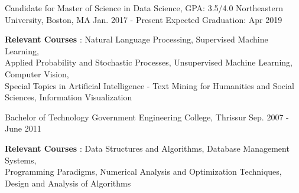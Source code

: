 \vspace{-0.1cm}
\begin{cventries}
  \cventry
    {Candidate for Master of Science in Data Science, GPA: 3.5/4.0}
    {Northeastern University, Boston, MA}
    {Jan. 2017 - Present}
    {Expected Graduation: Apr 2019 }
    {
      \begin{cvitems}
      \item {\textbf{Relevant Courses} : Natural Language Processing, Supervised Machine Learning, \\ Applied Probability and Stochastic Processes, Unsupervised Machine Learning, Computer Vision, \\Special Topics in Artificial Intelligence - Text Mining for Humanities and Social Sciences, Information Visualization}
      \end{cvitems}
    }
      \cventry
    {Bachelor of Technology}
    {Government Engineering College, Thrissur}
    {Sep. 2007 - June 2011}
    {}
    {
      \begin{cvitems}
      \item {\textbf{Relevant Courses} : Data Structures and Algorithms, Database Management Systems, \\
          Programming Paradigms, Numerical Analysis and Optimization Techniques, Design and Analysis of Algorithms}
      \end{cvitems}
    }
\end{cventries}


